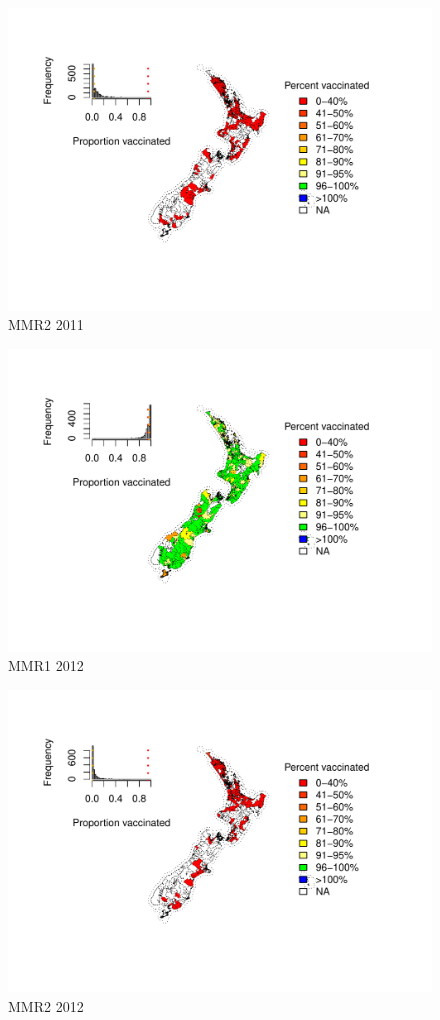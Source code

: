 \documentclass{article}
\begin{document}
\begin{figure}
    \centering
    \includegraphics[width=5.0in]{nir_census_MMR2_NIR_2011.pdf}
    \caption{MMR2 2011}
\end{figure}


\begin{figure}
    \centering
    \includegraphics[width=5.0in]{nir_census_MMR1_NIR_2012.pdf}
    \caption{MMR1 2012}
\end{figure}

\begin{figure}
    \centering
    \includegraphics[width=5.0in]{nir_census_MMR2_NIR_2012.pdf}
    \caption{MMR2 2012}
\end{figure}
\end{document}
